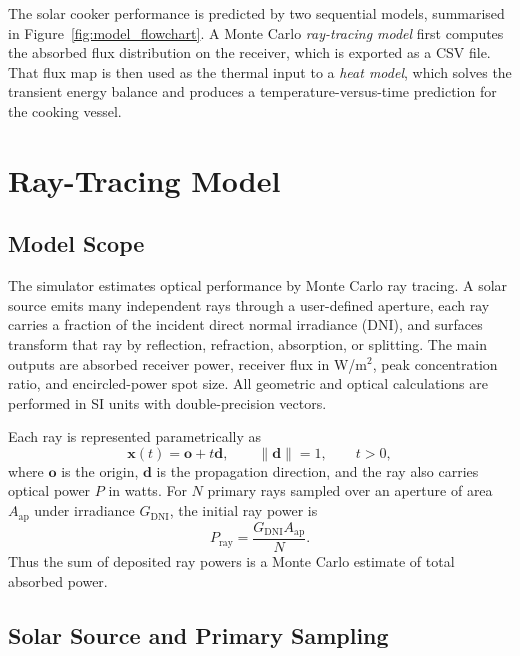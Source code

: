 The solar cooker performance is predicted by two sequential models, summarised in
Figure~\ref{fig:model_flowchart}.  A Monte Carlo \textit{ray-tracing model} first computes
the absorbed flux distribution on the receiver, which is exported as a CSV file.  That
flux map is then used as the thermal input to a \textit{heat model}, which solves the
transient energy balance and produces a temperature-versus-time prediction for the cooking
vessel.



\section{Ray-Tracing Model}
\label{sec:ray_tracing_model}

\subsection{Model Scope}

The simulator estimates optical performance by Monte Carlo ray tracing.  A solar source emits
many independent rays through a user-defined aperture, each ray carries a fraction of the
incident direct normal irradiance (DNI), and surfaces transform that ray by reflection,
refraction, absorption, or splitting.  The main outputs are absorbed receiver power, receiver
flux in W/m$^2$, peak concentration ratio, and encircled-power spot size.  All geometric and
optical calculations are performed in SI units with double-precision vectors.

Each ray is represented parametrically as
\begin{equation}
  \mathbf{x}(t) = \mathbf{o} + t\mathbf{d}, \qquad
  \|\mathbf{d}\| = 1, \qquad t > 0 ,
\end{equation}
where $\mathbf{o}$ is the origin, $\mathbf{d}$ is the propagation direction, and the ray also
carries optical power $P$ in watts.  For $N$ primary rays sampled over an aperture of area
$A_\mathrm{ap}$ under irradiance $G_\mathrm{DNI}$, the initial ray power is
\begin{equation}
  P_\mathrm{ray} = \frac{G_\mathrm{DNI} A_\mathrm{ap}}{N}.
  \label{eq:ray_power}
\end{equation}
Thus the sum of deposited ray powers is a Monte Carlo estimate of total absorbed power.

\subsection{Solar Source and Primary Sampling}

